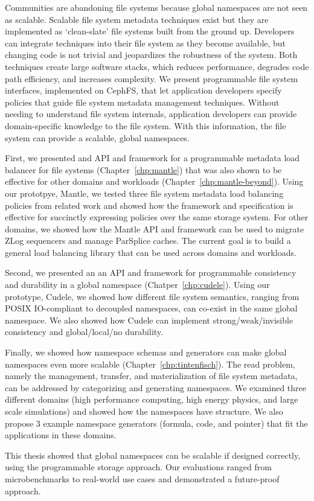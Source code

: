 Communities are abandoning file systems because global namespaces are not seen
as scalable.  Scalable file system metadata techniques exist but they are
implemented as `clean-slate' file systems built from the ground up. Developers
can integrate techniques into their file system as they become available, but
changing code is not trivial and jeopardizes the robustness of the system. Both
techniques create large software stacks, which reduces performance, degrades
code path efficiency, and increases complexity. We present programmable file
system interfaces, implemented on CephFS, that let application developers
specify policies that guide file system metadata management techniques. Without
needing to understand file system internals, application developers can provide
domain-specific knowledge to the file system. With this information, the file
system can provide a scalable, global namespaces.

First, we presented and API and framework for a programmable metadata load
balancer for file systems (Chapter~\ref{chp:mantle}) that was also shown to be
effective for other domains and workloads (Chapter~\ref{chp:mantle-beyond}).
Using our prototpye, Mantle, we tested three file system metadata load
balancing policies from related work and showed how the framework and
specification is effective for succinctly expressing policies over the same
storage system. For other domains, we showed how the Mantle API and framework
can be used to migrate ZLog sequencers and manage ParSplice caches. The current
goal is to build a general load balancing library that can be used across
domains and workloads.

Second, we presented an an API and framework for programmable consistency and
durability in a global namespace (Chatper~\ref{chp:cudele}). Using our
prototype, Cudele, we showed how different file system semantics, ranging from
POSIX IO-compliant to decoupled namespaces, can co-exist in the same global
namespace. We also showed how Cudele can implement strong/weak/invisible
consistency and global/local/no durability.

Finally, we showed how namespace schemas and generators can make global
namespaces even more scalable (Chapter~\ref{chp:tintenfisch}). The read
problem, namely the management, transfer, and materialization of file system
metadata, can be addressed by categorizing and generating namespaces. We
examined three different domains (high performance computing, high energy
physics, and large scale simulations) and showed how the namespaces have
structure. We also propose 3 example namespace generators (formula, code, and
pointer) that fit the applications in these domains.

This thesis showed that global namespaces can be scalable if designed correctly,
using the programmable storage approach. Our evaluations ranged from
microbenchmarks to real-world use cases and demonstrated a future-proof
approach.
